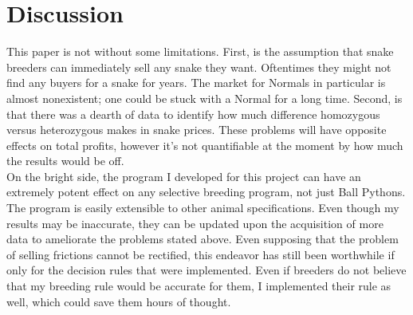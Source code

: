 \documentclass{article}
\begin{document}
		\section*{Discussion}
		\indent \indent This paper is not without some limitations. First, is the assumption that snake breeders can immediately sell any snake they want. Oftentimes they might not find any buyers for a snake for years. The market for Normals in particular is almost nonexistent; one could be stuck with a Normal for a long time. Second, is that there was a dearth of data to identify how much difference homozygous versus heterozygous makes in snake prices. These problems will have opposite effects on total profits, however it's not quantifiable at the moment by how much the results would be off.\\
		\indent On the bright side, the program I developed for this project can have an extremely potent effect on any selective breeding program, not just Ball Pythons. The program is easily extensible to other animal specifications. Even though my results may be inaccurate, they can be updated upon the acquisition of more data to ameliorate the problems stated above. Even supposing that the problem of selling frictions cannot be rectified, this endeavor has still been worthwhile if only for the decision rules that were implemented. Even if breeders do not believe that my breeding rule would be accurate for them, I implemented their rule as well, which could save them hours of thought.
		



\nocite{*}
\end{document}
